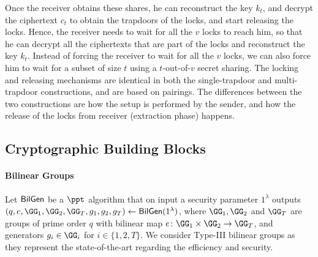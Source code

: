 Once the receiver obtains these shares, he can reconstruct the key $k_t$, and decrypt the 
ciphertext $c_t$ to obtain the trapdoors of the locks, and start releasing the locks. Hence, the 
receiver needs to wait for all the $v$ locks to reach him, so that he can decrypt all the 
ciphertexts that are part of the locks and reconstruct the key $k_t$. Instead of forcing the 
receiver to wait for all the $v$ locks, we can also force him to wait for a subset of size $t$  
using a $t$-out-of-$v$ secret sharing. The locking and releasing mechanisms are identical in 
both the single-trapdoor and multi-trapdoor constructions, and are based on pairings. 
The differences between the two constructions are how the setup is performed by the sender, and 
how the release of the locks from receiver (extraction phase) happens.

\subsection{Cryptographic Building Blocks}

\paragraph{Bilinear Groups} Let $\mathsf{BilGen}$ be a $\ppt$ algorithm that on input a security 
parameter $1^\lambda$ outputs $(q, e, \GG_1, \GG_2, \GG_T, g_1, g_2, g_T) \gets 
\BilGen(1^\lambda)$, where $\GG_1, \GG_2$ and $\GG_T$ are groups of prime order $q$ with 
bilinear map $e \colon \GG_1 \times \GG_2 \to \GG_T$, and generators $g_i \in \GG_i$ for $i \in 
\{1,2,T\}$. We consider Type-III bilinear groups as they represent the state-of-the-art regarding 
the efficiency and security.

